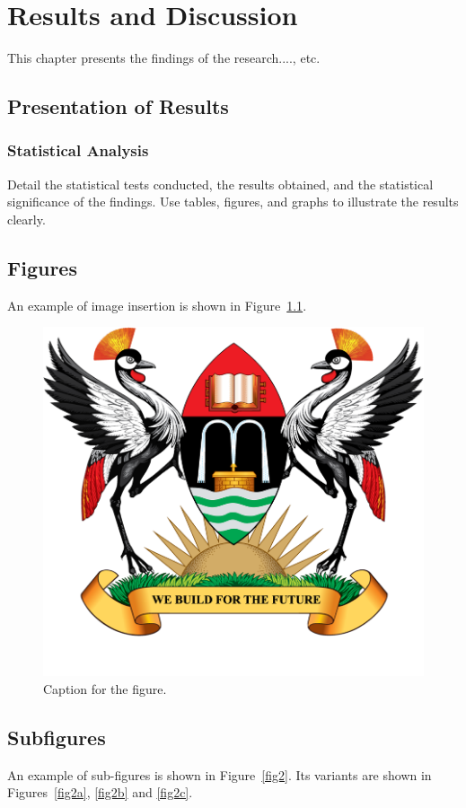 \chapter{Results and Discussion}
\label{chap:results_and_discussion}

This chapter presents the findings of the research...., etc.

\section{Presentation of Results}
\subsection{Statistical Analysis}
Detail the statistical tests conducted, the results obtained, and the statistical significance of the findings. Use tables, figures, and graphs to illustrate the results clearly.
\section{Figures}
An example of image insertion is shown in Figure~\ref{fig1}.
\begin{figure}[h]
    \centering
    \includegraphics[width=0.5\linewidth]{images/Mak-Log.png}
    \caption{Caption for the figure.}
    \label{fig1}
\end{figure}


\section{Subfigures}
An example of sub-figures is shown in Figure~\ref{fig2}. Its variants are shown in Figures~\ref{fig2a}, \ref{fig2b} and \ref{fig2c}.

